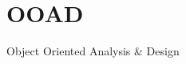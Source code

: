 \section{OOAD}
\begin{frame}
\begin{center}
\huge
Object Oriented Analysis \& Design
\end{center}
\end{frame}
